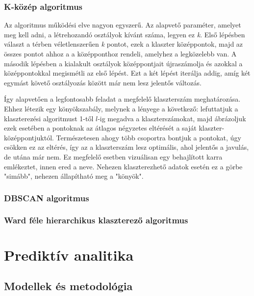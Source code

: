\documentclass[12pt]{article}
\begin{document}
\subsubsection{K-közép algoritmus}
Az algoritmus működési elve nagyon egyszerű. Az alapvető paraméter, amelyet meg kell adni, a létrehozandó osztályok kívánt száma, legyen ez \textit{k}. Első lépésben választ a térben véletlenszerűen \textit{k} pontot, ezek a klaszter középpontok, majd az összes pontot ahhoz a a középponthoz rendeli, amelyhez a legközelebb van. A második lépésben a kialakult osztályok középpontjait újraszámolja és azokkal a középpontokkal megismétli az első lépést. Ezt a két lépést iterálja addig, amíg két egymást követő osztályozás között már nem lesz jelentős változás.

Így alapvetően a legfontosabb feladat a megfelelő klaszterszám meghatározása. Ehhez létezik egy könyökszabály, melynek a lényege a következő: lefuttatjuk a klaszterezési algoritmust 1-től $l$-ig megadva a klaszterszámokat, majd ábrázoljuk ezek esetében a pontoknak az átlagos négyzetes eltérését a saját klaszter-középpontjuktól. Természetesen ahogy több csoportra bontjuk a pontokat, úgy csökken ez az eltérés, így az a klaszterszám lesz optimális, ahol jelentős a javulás, de utána már nem. Ez megfelelő esetben vizuálisan egy behajlított karra emlékeztet, innen ered a neve. Nehezen klaszterezhető adatok esetén ez a görbe "simább", nehezen állapítható meg a "könyök".

\subsubsection{DBSCAN algoritmus}


\subsubsection{Ward féle hierarchikus klaszterező algoritmus}



\newpage
\section{Prediktív analitika}

\subsection{Modellek és metodológia}
\end{document}
